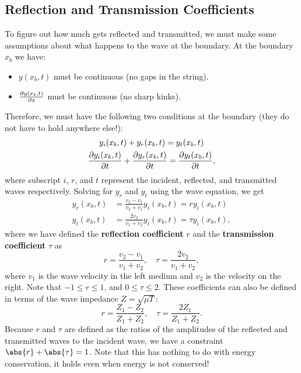\documentclass[../classical_mechanics.tex]{subfiles}
\begin{document}
        \subsection{Reflection and Transmission Coefficients}\label{subsec:reflection-and-transmission-coefficients}
            To figure out how much gets reflected and transmitted, we must make some assumptions about what happens to the wave at the boundary.
            At the boundary $x_b$ we have:
            \begin{itemize}
                \item $y(x_b,t)$ must be continuous (no gaps in the string).
                \item $\pdv{y(x_b,t)}{x}$ must be continuous (no sharp kinks).
            \end{itemize}
            Therefore, we must have the following two conditions at the boundary (they do not have to hold anywhere else!):
            \begin{gather}
                y_i(x_b,t)+y_r(x_b,t)=y_t(x_b,t)\\
                \pdv{y_i(x_b,t)}{t}+\pdv{y_r(x_b,t)}{t}=\pdv{y_t(x_b,t)}{t},
            \end{gather}
            where subscript $i$, $r$, and $t$ represent the incident, reflected, and transmitted waves respectively.
            Solving for $y_r$ and $y_t$ using the wave equation, we get
            \begin{align}
                y_r(x_b,t)&=\frac{v_2-v_1}{v_2+v_1}y_i(x_b,t)=ry_i(x_b,t)\\
                y_t(x_b,t)&=\frac{2v_2}{v_1+v_2}y_i(x_b,t)=\tau y_i(x_b,t),
            \end{align}
            where we have defined the \textbf{reflection coefficient} $r$ and the \textbf{transmission coefficient} $\tau$ as
            \begin{equation}
                r=\frac{v_2-v_1}{v_1+v_2},\quad\tau=\frac{2v_2}{v_1+v_2},
            \end{equation}
            where $v_1$ is the wave velocity in the left medium and $v_2$ is the velocity on the right.
            Note that $-1\leq r\leq 1$, and $0\leq\tau\leq 2$.
            These coefficients can also be defined in terms of the wave impedance $Z=\sqrt{\mu T}$:
            \begin{equation}
                r=\frac{Z_1-Z_2}{Z_1+Z_2},\quad\tau=\frac{2Z_1}{Z_1+Z_2}.
            \end{equation}
            Because $r$ and $\tau$ are defined as the ratios of the amplitudes of the reflected and transmitted waves to the incident wave, we have a constraint $\abs{r}+\abs{\tau}=1$.
            Note that this has nothing to do with energy conservation, it holds even when energy is not conserved!
\end{document}

